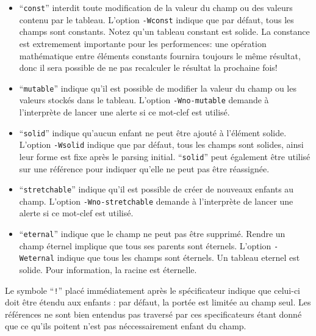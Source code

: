 \documentclass[a5paper, 12pt]{book}
\begin{document}
\begin{itemize}
  \item ``\verb!const!'' interdit toute modification de la valeur du champ
    ou des valeurs contenu par le tableau.
    L'option \verb!-Wconst! indique que par défaut, tous les champs sont
    constants. Notez qu'un tableau constant est solide.
    La constance est extremement importante pour les performences:
    une opération mathématique entre éléments constants fournira
    toujours le même résultat, donc il sera possible de ne pas
    recalculer le résultat la prochaine fois!
    \vspace{\baselineskip}
  \item ``\verb!mutable!'' indique qu'il est possible de modifier la valeur du champ
    ou les valeurs stockés dans le tableau.
    L'option \verb!-Wno-mutable! demande à l'interprète de lancer
    une alerte si ce mot-clef est utilisé.
    \vspace{\baselineskip}

  \item ``\verb!solid!'' indique qu'aucun enfant ne peut être ajouté à
    l'élément solide.
    L'option \verb!-Wsolid! indique que par défaut, tous les champs
    sont solides, ainsi leur forme est fixe après le parsing
    initial.
    ``\verb!solid!'' peut également être utilisé sur une référence pour
    indiquer qu'elle ne peut pas être réassignée.
    \vspace{\baselineskip}
  \item ``\verb!stretchable!'' indique qu'il est possible de créer
    de nouveaux enfants au champ.
    L'option \verb!-Wno-stretchable! demande à l'interprète de lancer
    une alerte si ce mot-clef est utilisé.
    \vspace{\baselineskip}

  \item ``\verb!eternal!'' indique que le champ ne peut pas être supprimé.
    Rendre un champ éternel implique que tous ses parents sont éternels.
    L'option \verb!-Weternal! indique que tous les champs sont éternels.
    Un tableau eternel est solide.
    Pour information, la racine est éternelle.
    \vspace{\baselineskip}
\end{itemize}

Le symbole ``\verb|!|'' placé immédiatement après le spécificateur indique
que celui-ci doit être étendu aux enfants : par défaut, la portée
est limitée au champ seul. Les références ne sont bien entendus
pas traversé par ces specificateurs étant donné que ce qu'ils
poitent n'est pas néccessairement enfant du champ.\\
\end{document}
